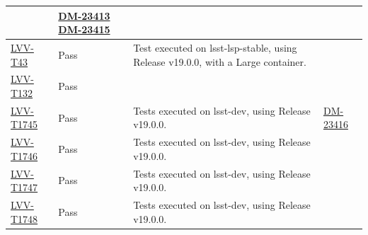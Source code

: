 \documentclass[DM,STR,toc]{lsstdoc}
\begin{document}
\begin{longtable}{p{2cm}p{2.5cm}p{9cm}p{2.5cm}}
\begin{minipage}[]{9cm}
    \medskip
    \end{minipage}
    &
          \href{https://jira.lsstcorp.org/browse/DM-23413}{DM-23413}
          \href{https://jira.lsstcorp.org/browse/DM-23415}{DM-23415}
    \\\hline
\href{https://jira.lsstcorp.org/secure/Tests.jspa#/testCase/LVV-T43}{LVV-T43}
    & Pass &
    \begin{minipage}[]{9cm}
    \smallskip
     Test executed on lsst-lsp-stable, using Release v19.0.0, with a Large
container.

    \medskip
    \end{minipage}
    &
    \\\hline
\href{https://jira.lsstcorp.org/secure/Tests.jspa#/testCase/LVV-T132}{LVV-T132}
    & Pass &
    \begin{minipage}[]{9cm}
    \smallskip
    
    \medskip
    \end{minipage}
    &
    \\\hline
\href{https://jira.lsstcorp.org/secure/Tests.jspa#/testCase/LVV-T1745}{LVV-T1745}
    & Pass &
    \begin{minipage}[]{9cm}
    \smallskip
     Tests executed on lsst-dev, using Release v19.0.0.

    \medskip
    \end{minipage}
    &
          \href{https://jira.lsstcorp.org/browse/DM-23416}{DM-23416}
    \\\hline
\href{https://jira.lsstcorp.org/secure/Tests.jspa#/testCase/LVV-T1746}{LVV-T1746}
    & Pass &
    \begin{minipage}[]{9cm}
    \smallskip
     Tests executed on lsst-dev, using Release v19.0.0.

    \medskip
    \end{minipage}
    &
    \\\hline
\href{https://jira.lsstcorp.org/secure/Tests.jspa#/testCase/LVV-T1747}{LVV-T1747}
    & Pass &
    \begin{minipage}[]{9cm}
    \smallskip
     Tests executed on lsst-dev, using Release v19.0.0.

    \medskip
    \end{minipage}
    &
    \\\hline
\href{https://jira.lsstcorp.org/secure/Tests.jspa#/testCase/LVV-T1748}{LVV-T1748}
    & Pass &
    \begin{minipage}[]{9cm}
    \smallskip
     Tests executed on lsst-dev, using Release v19.0.0.


\end{minipage}
\end{longtable}
\end{document}
